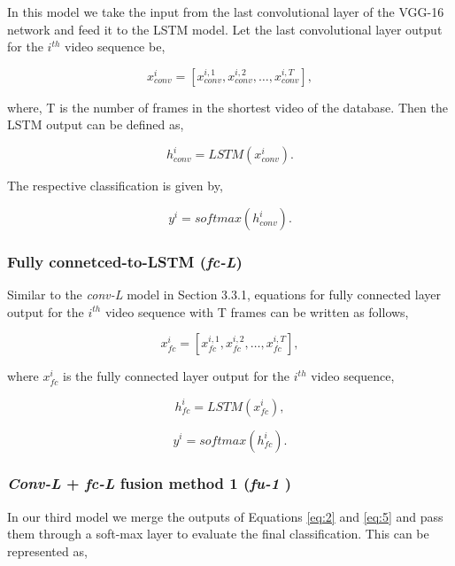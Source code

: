 \documentclass[10pt,twocolumn,letterpaper]{article}
\begin{document}
 In this model we take the input from the last convolutional layer of the VGG-16 network and feed it to the LSTM model. Let the last convolutional layer output for the $i^{th}$ video sequence be,
  
\begin{equation}
x^i_{conv}=[x^{i,1}_{conv}, x^{i,2}_{conv}, \ldots,x^{i,T}_{conv}],
\label{eq:1}
\end{equation}

where, T is the number of frames in the shortest video of the database.
Then the LSTM output can be defined as, 

\begin{equation}
h^i_{conv}= LSTM(x^i_{conv}).
\label{eq:2}
\end{equation}

The respective classification is given by, 

\begin{equation}
y^i=softmax(h^i_{conv}).
\label{eq:3}
\end{equation}


\subsubsection{Fully connetced-to-LSTM (\textit{fc-L})}

Similar to the \textit{conv-L} model in Section 3.3.1, equations for fully connected layer output for the $i^{th}$ video sequence with T frames can be written as follows,

\begin{equation}
x^i_{fc}=[x^{i,1}_{fc}, x^{i,2}_{fc}, \ldots,x^{i,T}_{fc}],
\label{eq:4}
\end{equation}

where $x^i_{fc}$ is the fully connected layer output for the $i^{th}$ video sequence, 

\begin{equation}
h^i_{fc}= LSTM(x^i_{fc}),
\label{eq:5}
\end{equation}

\begin{equation}
y^i=softmax(h^i_{fc}).
\label{eq:6}
\end{equation}

\subsubsection{\textit{Conv-L} + \textit{fc-L} fusion method 1 (\textit{fu-1} )}

In our third model we merge the outputs of Equations \ref{eq:2} and \ref{eq:5} and pass them through a soft-max layer to evaluate the final classification. This can be represented as,
\end{document}
